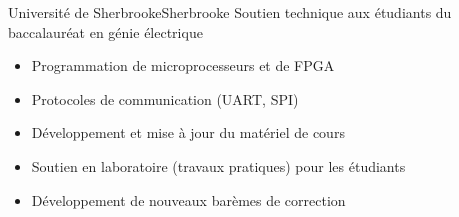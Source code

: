 {Université de Sherbrooke}{Sherbrooke}
{Soutien technique aux étudiants du baccalauréat en génie électrique}
{\vspace{-12pt}
\begin{itemize}
	\item Programmation de microprocesseurs et de FPGA
	\item Protocoles de communication (UART, SPI)
	\item Développement et mise à jour du matériel de cours
	\item Soutien en laboratoire (travaux pratiques) pour les étudiants
	\item Développement de nouveaux barèmes de correction
\end{itemize}}
